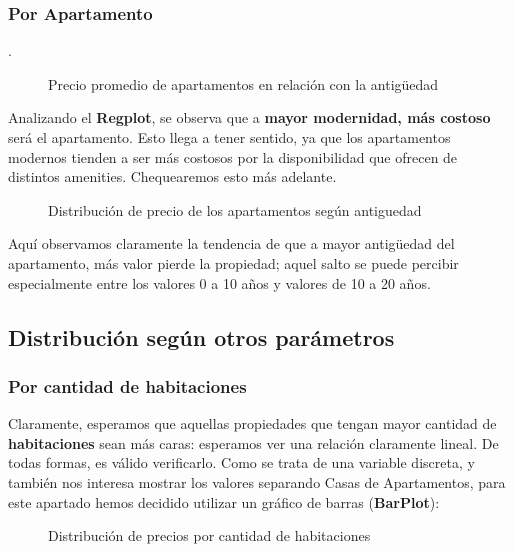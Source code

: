 \documentclass[
10pt, %
a4paper, %
oneside, %
headinclude,footinclude, %
BCOR5mm, %
]{scrartcl}
\begin{document}
    \subsubsection{Por Apartamento}.
        \begin{figure}[H]
            \caption{Precio promedio de apartamentos en relación con la antigüedad}
             \label{fig:precio-depa-antiguedad-reg}
        \end{figure}
        
    Analizando el \textbf{Regplot}, se observa que a \textbf{mayor modernidad, más costoso} será el apartamento. Esto llega a tener sentido, ya que los apartamentos modernos tienden a ser más costosos por la disponibilidad que ofrecen de distintos amenities. Chequearemos esto más adelante.
    
        \begin{figure}[H]
            \caption{Distribución de precio de los apartamentos según antiguedad}
             \label{fig:precio-depa-antiguedad-scatt}
        \end{figure}
    
    Aquí observamos claramente la tendencia de que a mayor antigüedad del apartamento, más valor pierde la propiedad; aquel salto se puede percibir especialmente entre los valores 0 a 10 años y valores de 10 a 20 años. 

\newpage    
\subsection{Distribuci\'on seg\'un otros par\'ametros}
    \subsubsection{Por cantidad de habitaciones}
    Claramente, esperamos que aquellas propiedades que tengan mayor cantidad de \textbf{habitaciones} sean m\'as caras: esperamos ver una relaci\'on claramente lineal. De todas formas, es v\'alido verificarlo.
    \vskip 2mm
    Como se trata de una variable discreta, y tambi\'en nos interesa mostrar los valores separando Casas de Apartamentos, para este apartado hemos decidido utilizar un gr\'afico de barras (\textbf{BarPlot}):

    \begin{figure}[H]
        \caption{Distribuci\'on de precios por cantidad de habitaciones}
        \label{fig:precio-distribucion-habitaciones}
    \end{figure}
    
\end{document}
